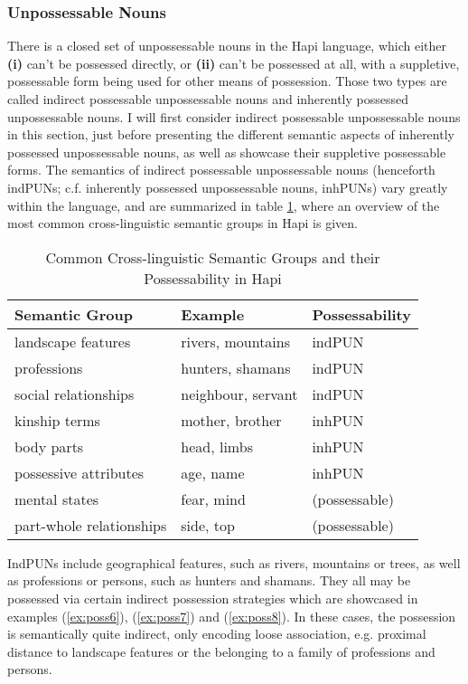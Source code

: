 \documentclass[a4paper, 12pt, oneside]{memoir}
\begin{document}
\subsubsection{Unpossessable Nouns}\label{sinalien}
There is a closed set of unpossessable nouns in the Hapi language, which either \textbf{(i)} can't be possessed directly, or \textbf{(ii)} can't be possessed at all, with a suppletive, possessable form being used for other means of possession. Those two types are called indirect possessable unpossessable nouns and inherently possessed unpossessable nouns. I will first consider indirect possessable unpossessable nouns in this section, just before presenting the different semantic aspects of inherently possessed unpossessable nouns, as well as showcase their suppletive possessable forms. 
The semantics of indirect possessable unpossessable nouns (henceforth indPUNs; c.f. inherently possessed unpossessable nouns, inhPUNs) vary greatly within the language, and are summarized in table \ref{t:ccsgip}, where an overview of the most common cross-linguistic semantic groups in Hapi is given.
\begin{table}[H]
\centering
\captionsetup{justification=centering}
\begin{tabular}{@{}lll@{}}
\toprule
Semantic Group & Example & Possessability \\ \midrule
landscape features & rivers, mountains & indPUN \\
professions & hunters, shamans & indPUN \\
social relationships & neighbour, servant & indPUN \\
kinship terms & mother, brother & inhPUN \\
body parts & head, limbs & inhPUN \\
possessive attributes & age, name & inhPUN \\
mental states & fear, mind & (possessable) \\
part-whole relationships & side, top & (possessable) \\ \bottomrule
\end{tabular}
\caption{Common Cross-linguistic Semantic Groups and their Possessability in Hapi}
\label{t:ccsgip}
\end{table}
IndPUNs include geographical features, such as rivers, mountains or trees, as well as professions or persons, such as hunters and shamans. 
They all may be possessed via certain indirect possession strategies which are showcased in examples (\ref{ex:poss6}), (\ref{ex:poss7}) and (\ref{ex:poss8}). In these cases, the possession is semantically quite indirect, only encoding loose association, e.g. proximal distance to landscape features or the belonging to a family of professions and persons. 
\end{document}
